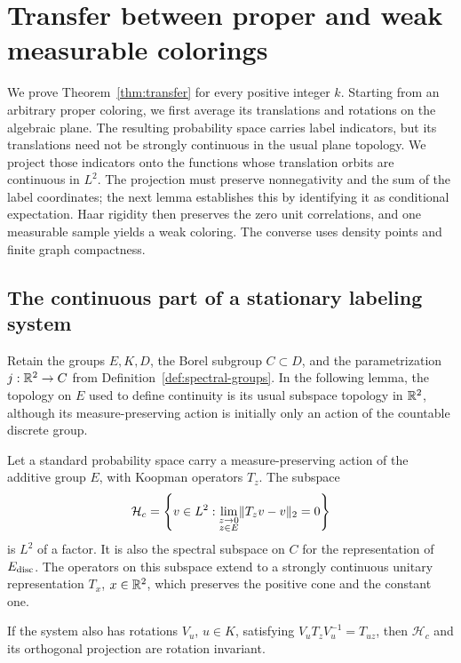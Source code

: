 \section{Transfer between proper and weak measurable colorings}
\label{sec:transfer}

We prove Theorem~\ref{thm:transfer} for every positive integer $k$.
Starting from an arbitrary proper coloring, we first average its
translations and rotations on the algebraic plane.  The resulting
probability space carries label indicators, but its translations need
not be strongly continuous in the usual plane topology.  We project those
indicators onto the functions whose translation orbits are continuous in $L^2$.
The projection must preserve nonnegativity and the sum of the label
coordinates; the next lemma establishes this by identifying it as
conditional expectation.  Haar rigidity then preserves the zero unit
correlations, and one measurable sample yields a weak coloring.
The converse uses density points and finite graph compactness.

\subsection{The continuous part of a stationary labeling system}

Retain the groups \(E,K,D\), the Borel subgroup \(C\subset D\), and
the parametrization \(j:\mathbb R^2\to C\) from
Definition~\ref{def:spectral-groups}.  In the following lemma, the topology
on \(E\) used to define continuity is its usual subspace topology in
\(\mathbb R^2\), although its measure-preserving action is initially only an
action of the countable discrete group.

\begin{lemma}
\label{lem:palettes-continuous-factor}
Let a standard probability space carry a measure-preserving action of
the additive group \(E\), with Koopman operators \(T_z\).  The subspace
\[
 \mathcal H_c
 =\left\{v\in L^2:
       \lim_{\substack{z\to0\\z\in E}}\lVert T_zv-v\rVert_2=0\right\}
\]
is \(L^2\) of a factor.  It is also the spectral subspace on \(C\)
for the representation of \(E_{\rm disc}\).
The operators on this subspace extend to a strongly continuous
unitary representation \(T_x\), \(x\in\mathbb R^2\), which preserves the positive
cone and the constant one.

If the system also has rotations \(V_u\), \(u\in K\), satisfying
\(V_uT_zV_u^{-1}=T_{uz}\), then \(\mathcal H_c\) and its orthogonal
projection are rotation invariant.
\end{lemma}

